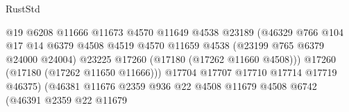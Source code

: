 \begin{lexlean}{RustStd}
\begin{coremodule}
                                                    @19
                                                    @6208
                                                    @11666
                                                    @11673
                                                    @4570
                                                    @11649
                                                    @4538
                                                    @23189
                                                    (@46329
                                                      @766
                                                      @104
                                                      @17
                                                      @14
                                                      @6379
                                                      @4508
                                                      @4519
                                                      @4570
                                                      @11659
                                                      @4538
                                                      (@23199 @765 @6379 @24000 @24004)
                                                      @23225
                                                      @17260
                                                      (@17180 (@17262 @11660 @4508)))
                                                    @17260
                                                    (@17180 (@17262 @11650 @11666)))
                                                  @17704
                                                  @17707
                                                  @17710
                                                  @17714
                                                  @17719
                                                  @46375)
                                                (@46381
                                                  @11676
                                                  @2359
                                                  @936
                                                  @22
                                                  @4508
                                                  @11679
                                                  @4508
                                                  @6742
                                                  (@46391
                                                    @2359
                                                    @22
                                                    @11679

\end{coremodule}
\end{lexlean}
